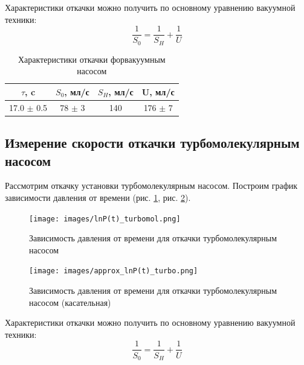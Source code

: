 \documentclass[a4paper, 12pt]{article}
\begin{document}
            Характеристики откачки можно получить по основному уравнению вакуумной техники:
            \begin{equation}
                \frac{1}{S_0} = \frac{1}{S_H}+\frac{1}{U} 
            \end{equation}
            
            \begin{table}[H]   
                \centering
                \begin{tabular}{|c|c|c|c|}
                    \hline 
                    $\tau$, c & $S_0$, мл/с& $S_H$, мл/с& U, мл/с  \\ 
                    \hline 
                    17.0 $\pm$ 0.5 & 78 $\pm$ 3 & 140 & 176 $\pm$ 7\\ 
                    \hline  
                \end{tabular} 
                \caption{Характеристики откачки форвакуумным насосом}
            \end{table}

        \subsection*{Измерение скорости откачки турбомолекулярным насосом}
            Рассмотрим откачку установки турбомолекулярным насосом. Построим график зависимости давления от времени (рис. \ref{graph:turbo}, рис. \ref{graph:approx_turbo}).

            \begin{figure}[H]
                \centering
                \texttt{[image: images/lnP(t)\_turbomol.png]}
                \caption{Зависимость давления от времени для откачки турбомолекулярным насосом}
                \label{graph:turbo}
            \end{figure}
            
            \begin{figure}[H]
                \centering
                \texttt{[image: images/approx\_lnP(t)\_turbo.png]}
                \caption{Зависимость давления от времени для откачки турбомолекулярным насосом (касательная)}
                \label{graph:approx_turbo}
            \end{figure}

            Характеристики откачки можно получить по основному уравнению вакуумной техники:
            \begin{equation}
                \frac{1}{S_0} = \frac{1}{S_H}+\frac{1}{U} 
            \end{equation}
            
\end{document}
